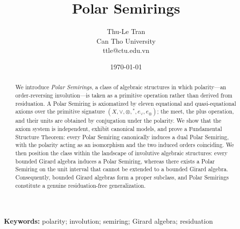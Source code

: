 \documentclass[11pt,a4paper]{article}
\title{Polar Semirings}
\author{%
    Thu-Le Tran\\
    Can Tho University \\
    ttle@ctu.edu.vn
}
\date{\today}
\begin{document}
\maketitle

\begin{abstract}
We introduce \emph{Polar Semirings}, a class of algebraic structures in which
polarity---an order-reversing involution---is taken as a primitive operation
rather than derived from residuation. A Polar Semiring is axiomatized by
eleven equational and quasi-equational axioms over the primitive signature
$(X,\vee,\otimes,{}^{*},e_\vee,e_\otimes)$; the meet, the plus operation, and
their units are obtained by conjugation under the polarity. We show that the
axiom system is independent, exhibit canonical models, and prove a
Fundamental Structure Theorem: every Polar Semiring canonically induces a dual
Polar Semiring, with the polarity acting as an isomorphism and the two induced
orders coinciding. We then position the class within the landscape of
involutive algebraic structures: every bounded Girard algebra induces a Polar
Semiring, whereas there exists a Polar Semiring on the unit interval that
cannot be extended to a bounded Girard algebra. Consequently, bounded Girard
algebras form a proper subclass, and Polar Semirings constitute a genuine
residuation-free generalization.
\end{abstract}

\begin{center}
    \textbf{Keywords:} polarity; involution; semiring; Girard algebra; residuation
\end{center}




% 






\end{document}

